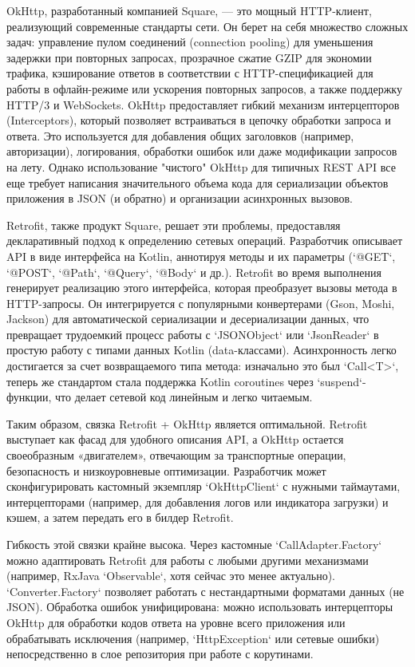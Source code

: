 OkHttp, разработанный компанией Square, — это мощный HTTP-клиент, реализующий современные стандарты сети. Он берет на себя множество сложных задач: управление пулом соединений (connection pooling) для уменьшения задержки при повторных запросах, прозрачное сжатие GZIP для экономии трафика, кэширование ответов в соответствии с HTTP-спецификацией для работы в офлайн-режиме или ускорения повторных запросов, а также поддержку HTTP/3 и WebSockets. OkHttp предоставляет гибкий механизм интерцепторов (Interceptors), который позволяет встраиваться в цепочку обработки запроса и ответа. Это используется для добавления общих заголовков (например, авторизации), логирования, обработки ошибок или даже модификации запросов на лету. Однако использование "чистого" OkHttp для типичных REST API все еще требует написания значительного объема кода для сериализации объектов приложения в JSON (и обратно) и организации асинхронных вызовов.

Retrofit, также продукт Square, решает эти проблемы, предоставляя декларативный подход к определению сетевых операций. Разработчик описывает API в виде интерфейса на Kotlin, аннотируя методы и их параметры (`@GET`, `@POST`, `@Path`, `@Query`, `@Body` и др.). Retrofit во время выполнения генерирует реализацию этого интерфейса, которая преобразует вызовы метода в HTTP-запросы. Он интегрируется с популярными конвертерами (Gson, Moshi, Jackson) для автоматической сериализации и десериализации данных, что превращает трудоемкий процесс работы с `JSONObject` или `JsonReader` в простую работу с типами данных Kotlin (data-классами). Асинхронность легко достигается за счет возвращаемого типа метода: изначально это был `Call<T>`, теперь же стандартом стала поддержка Kotlin coroutines через `suspend`-функции, что делает сетевой код линейным и легко читаемым. \cite{reff}

Таким образом, связка Retrofit + OkHttp является оптимальной. Retrofit выступает как фасад для удобного описания API, а OkHttp остается своеобразным «двигателем», отвечающим за транспортные операции, безопасность и низкоуровневые оптимизации. Разработчик может сконфигурировать кастомный экземпляр `OkHttpClient` с нужными таймаутами, интерцепторами (например, для добавления логов или индикатора загрузки) и кэшем, а затем передать его в билдер Retrofit. \cite{reff}

Гибкость этой связки крайне высока. Через кастомные `CallAdapter.Factory` можно адаптировать Retrofit для работы с любыми другими механизмами (например, RxJava `Observable`, хотя сейчас это менее актуально). `Converter.Factory` позволяет работать с нестандартными форматами данных (не JSON). Обработка ошибок унифицирована: можно использовать интерцепторы OkHttp для обработки кодов ответа на уровне всего приложения или обрабатывать исключения (например, `HttpException` или сетевые ошибки) непосредственно в слое репозитория при работе с корутинами. \cite{reff}

